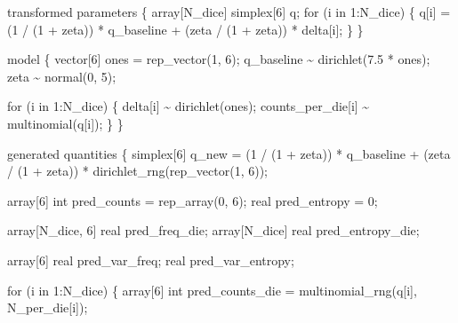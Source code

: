 \documentclass[
  letterpaper,
  DIV=11,
  numbers=noendperiod]{scrartcl}
\newenvironment{Shaded}{\begin{snugshade}}{\end{snugshade}}
\newcommand{\ControlFlowTok}[1]{\textcolor[rgb]{0.00,0.23,0.31}{#1}}
\newcommand{\DataTypeTok}[1]{\textcolor[rgb]{0.68,0.00,0.00}{#1}}
\newcommand{\DecValTok}[1]{\textcolor[rgb]{0.68,0.00,0.00}{#1}}
\newcommand{\FloatTok}[1]{\textcolor[rgb]{0.68,0.00,0.00}{#1}}
\newcommand{\KeywordTok}[1]{\textcolor[rgb]{0.00,0.23,0.31}{#1}}
\newcommand{\NormalTok}[1]{\textcolor[rgb]{0.00,0.23,0.31}{#1}}
\begin{document}
\begin{codelisting}
\begin{Shaded}
\begin{Highlighting}[]
\KeywordTok{transformed parameters}\NormalTok{ \{}
  \DataTypeTok{array}\NormalTok{[N\_dice] }\DataTypeTok{simplex}\NormalTok{[}\DecValTok{6}\NormalTok{] q;}
  \ControlFlowTok{for}\NormalTok{ (i }\ControlFlowTok{in} \DecValTok{1}\NormalTok{:N\_dice) \{}
\NormalTok{    q[i] = (}\DecValTok{1}\NormalTok{  / (}\DecValTok{1}\NormalTok{ + zeta)) * q\_baseline + (zeta / (}\DecValTok{1}\NormalTok{ + zeta)) * delta[i];}
\NormalTok{  \}}
\NormalTok{\}}

\KeywordTok{model}\NormalTok{ \{}
  \DataTypeTok{vector}\NormalTok{[}\DecValTok{6}\NormalTok{] ones = rep\_vector(}\DecValTok{1}\NormalTok{, }\DecValTok{6}\NormalTok{);}
\NormalTok{  q\_baseline \textasciitilde{} dirichlet(}\FloatTok{7.5}\NormalTok{ * ones);}
\NormalTok{  zeta \textasciitilde{} normal(}\DecValTok{0}\NormalTok{, }\DecValTok{5}\NormalTok{);}

  \ControlFlowTok{for}\NormalTok{ (i }\ControlFlowTok{in} \DecValTok{1}\NormalTok{:N\_dice) \{}
\NormalTok{    delta[i] \textasciitilde{} dirichlet(ones);}
\NormalTok{    counts\_per\_die[i] \textasciitilde{} multinomial(q[i]);}
\NormalTok{  \}}
\NormalTok{\}}

\KeywordTok{generated quantities}\NormalTok{ \{}
  \DataTypeTok{simplex}\NormalTok{[}\DecValTok{6}\NormalTok{] q\_new =   (}\DecValTok{1}\NormalTok{  / (}\DecValTok{1}\NormalTok{ + zeta)) * q\_baseline}
\NormalTok{                     + (zeta / (}\DecValTok{1}\NormalTok{ + zeta)) * dirichlet\_rng(rep\_vector(}\DecValTok{1}\NormalTok{, }\DecValTok{6}\NormalTok{));}

  \DataTypeTok{array}\NormalTok{[}\DecValTok{6}\NormalTok{] }\DataTypeTok{int}\NormalTok{ pred\_counts = rep\_array(}\DecValTok{0}\NormalTok{, }\DecValTok{6}\NormalTok{);}
  \DataTypeTok{real}\NormalTok{ pred\_entropy = }\DecValTok{0}\NormalTok{;}

  \DataTypeTok{array}\NormalTok{[N\_dice, }\DecValTok{6}\NormalTok{] }\DataTypeTok{real}\NormalTok{ pred\_freq\_die;}
  \DataTypeTok{array}\NormalTok{[N\_dice] }\DataTypeTok{real}\NormalTok{ pred\_entropy\_die;}

  \DataTypeTok{array}\NormalTok{[}\DecValTok{6}\NormalTok{] }\DataTypeTok{real}\NormalTok{ pred\_var\_freq;}
  \DataTypeTok{real}\NormalTok{ pred\_var\_entropy;}

  \ControlFlowTok{for}\NormalTok{ (i }\ControlFlowTok{in} \DecValTok{1}\NormalTok{:N\_dice) \{}
    \DataTypeTok{array}\NormalTok{[}\DecValTok{6}\NormalTok{] }\DataTypeTok{int}\NormalTok{ pred\_counts\_die = multinomial\_rng(q[i], N\_per\_die[i]);}


\end{Highlighting}
\end{Shaded}
\end{codelisting}
\end{document}
